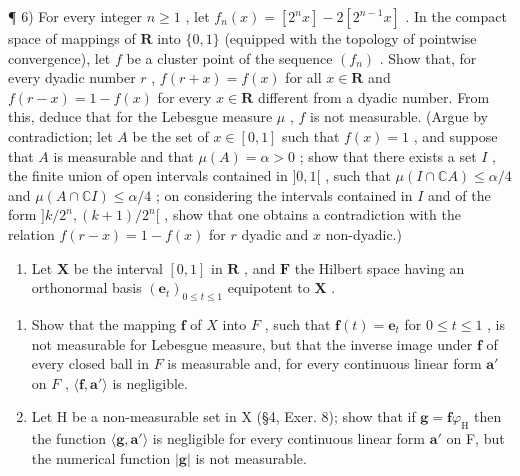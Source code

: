 ¶ 6) For every integer \(n \geqslant 1\) , let \(f_n(x) = [2^n x] - 2[2^{n-1}x]\) . In the compact space of mappings of \(\mathbf{R}\) into \(\{0,1\}\) (equipped with the topology of pointwise convergence), let \(f\) be a cluster point of the sequence \((f_n)\) . Show that, for every dyadic number \(r\) , \(f(r+x) = f(x)\) for all \(x \in \mathbf{R}\) and \(f(r-x) = 1 - f(x)\) for every \(x \in \mathbf{R}\) different from a dyadic number. From this, deduce that for the Lebesgue measure \(\mu\) , \(f\) is not measurable. (Argue by contradiction; let \(A\) be the set of \(x \in [0,1]\) such that \(f(x) = 1\) , and suppose that \(A\) is measurable and that \(\mu(A) = \alpha > 0\) ; show that there exists a set \(I\) , the finite union of open intervals contained in \(]0,1[\) , such that \(\mu(I \cap \mathbb{C}A) \leqslant \alpha/4\) and \(\mu(A \cap \mathbb{C}I) \leqslant \alpha/4\) ; on considering the intervals contained in \(I\) and of the form \(]k/2^n, (k+1)/2^n[\) , show that one obtains a contradiction with the relation \(f(r-x) = 1 - f(x)\) for \(r\) dyadic and \(x\) non-dyadic.)

\begin{enumerate}
\def\labelenumi{\arabic{enumi})}
\setcounter{enumi}{6}
\tightlist
\item
  Let \(\mathbf{X}\) be the interval \([0,1]\) in \(\mathbf{R}\) , and \(\mathbf{F}\) the Hilbert space having an orthonormal basis \((\mathbf{e}_t)_{0\leqslant t\leqslant 1}\) equipotent to \(\mathbf{X}\) .
\end{enumerate}

\begin{enumerate}
\def\labelenumi{\alph{enumi})}
\item
  Show that the mapping \(\mathbf{f}\) of \(X\) into \(F\) , such that \(\mathbf{f}(t) = \mathbf{e}_t\) for \(0 \leqslant t \leqslant 1\) , is not measurable for Lebesgue measure, but that the inverse image under \(\mathbf{f}\) of every closed ball in \(F\) is measurable and, for every continuous linear form \(\mathbf{a}'\) on \(F\) , \(\langle \mathbf{f}, \mathbf{a}' \rangle\) is negligible.
\item
  Let H be a non-measurable set in X (§4, Exer. 8); show that if \(\mathbf{g} = \mathbf{f}\varphi_{\mathrm{H}}\) then the function \(\langle \mathbf{g},\mathbf{a}'\rangle\) is negligible for every continuous linear form \(\mathbf{a}'\) on F, but the numerical function \(|\mathbf{g}|\) is not measurable.
\end{enumerate}

